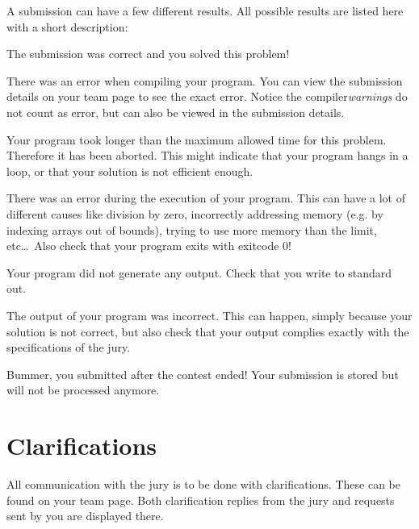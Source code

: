 A submission can have a few different results. All possible results
are listed here with a short description:

\begin{description}[\setleftmargin{4.5cm}]
\item[CORRECT]
The submission was correct and you solved this problem!

\item[COMPILER-ERROR]
There was an error when compiling your program. You can view the
submission details on your team page to see the exact error.
Notice the compiler\emph{warnings} do not count as error, but can also
be viewed in the submission details.

\item[TIMELIMIT]
Your program took longer than the maximum allowed time for this
problem. Therefore it has been aborted. This might indicate that your
program hangs in a loop, or that your solution is not efficient
enough.

\item[RUN-ERROR]
There was an error during the execution of your program. This can have
a lot of different causes like division by zero, incorrectly
addressing memory (e.g. by indexing arrays out of bounds), trying to
use more memory than the limit, etc\dots\ 
Also check that your program exits with exitcode 0!

\item[NO-OUTPUT]
Your program did not generate any output. Check that you write to
standard out.

\item[WRONG-ANSWER]
The output of your program was incorrect. This can happen, simply
because your solution is not correct, but also check that your output
complies exactly with the specifications of the jury.

\item[TOO-LATE]
Bummer, you submitted after the contest ended! Your submission is stored but
will not be processed anymore.
\end{description}

\section{Clarifications}

All communication with the jury is to be done with clarifications.
These can be found on your team page. Both clarification replies from
the jury and requests sent by you are displayed  there.

